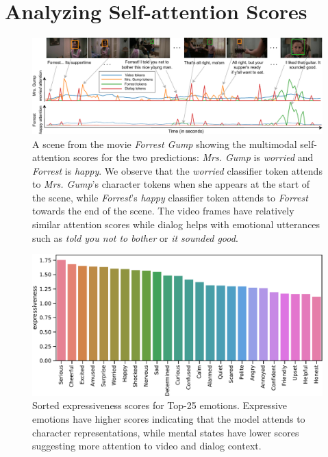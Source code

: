 \section{Analyzing Self-attention Scores}
\label{sec:selfattn}

\begin{figure}[t]
\centering
\includegraphics[width=0.99\linewidth]{Figures/qa.pdf}
\vspace{-2mm}
\caption{A scene from the movie \emph{Forrest Gump} showing the multimodal self-attention scores for the two predictions: \emph{Mrs. Gump} is \emph{worried} and \emph{Forrest} is \emph{happy}.
We observe that the \emph{worried} classifier token attends to \emph{Mrs. Gump}'s character tokens when she appears at the start of the scene, while \emph{Forrest}'s \emph{happy} classifier token attends to \emph{Forrest} towards the end of the scene.
The video frames have relatively similar attention scores while dialog helps with emotional utterances such as \emph{told you not to bother} or \emph{it sounded good}.}
\label{fig:qualitative_example}
\end{figure}

\begin{figure}[t]
\centering
\includegraphics[width=\linewidth]{Figures/expressiveness_25_NEW.pdf}
\vspace{-6mm}
\caption{Sorted expressiveness scores for Top-25 emotions. %
Expressive emotions have higher scores indicating that the model attends to character representations, while mental states have lower scores suggesting more  attention to video and dialog context.}
\label{fig:expression}
\end{figure}

